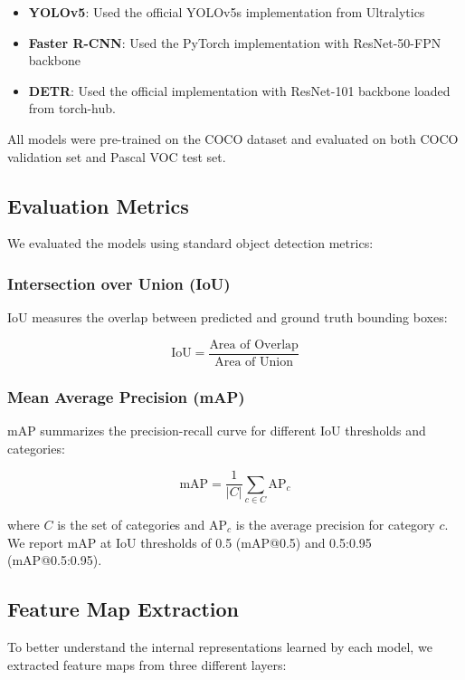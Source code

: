 \documentclass[12pt,a4paper]{article}
\begin{document}
\begin{itemize}
    \item \textbf{YOLOv5}: Used the official YOLOv5s implementation from Ultralytics
    \item \textbf{Faster R-CNN}: Used the PyTorch implementation with ResNet-50-FPN backbone
    \item \textbf{DETR}: Used the official implementation with ResNet-101 backbone loaded from torch-hub.
\end{itemize}

All models were pre-trained on the COCO dataset and evaluated on both COCO validation set and Pascal VOC test set.

\subsection{Evaluation Metrics}
We evaluated the models using standard object detection metrics:

\subsubsection{Intersection over Union (IoU)}
IoU measures the overlap between predicted and ground truth bounding boxes:

\begin{equation}
\text{IoU} = \frac{\text{Area of Overlap}}{\text{Area of Union}}
\end{equation}

\subsubsection{Mean Average Precision (mAP)}
mAP summarizes the precision-recall curve for different IoU thresholds and categories:

\begin{equation}
\text{mAP} = \frac{1}{|C|} \sum_{c \in C} \text{AP}_c
\end{equation}

where $C$ is the set of categories and $\text{AP}_c$ is the average precision for category $c$. We report mAP at IoU thresholds of 0.5 (mAP@0.5) and 0.5:0.95 (mAP@0.5:0.95).

\subsection{Feature Map Extraction}
To better understand the internal representations learned by each model, we extracted feature maps from three different layers:
\end{document}
